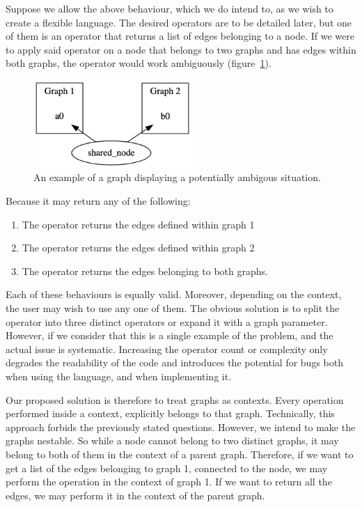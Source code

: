 Suppose we allow the above behaviour, which we do intend to, as we wish to create a flexible language.
The desired operators are to be detailed later, but one of them is an operator that returns a list of edges belonging to a node.
If we were to apply said operator on a node that belongs to two graphs and has edges within both graphs, the operator would work ambiguously
(figure~\ref{fig:syntax_ambigous}).

\begin{figure}[H]
    \centering
    \includegraphics[width=6cm]{figures/syntax_section/syntax_ambigous}
    \caption{An example of a graph displaying a potentially ambigous situation.}
    \label{fig:syntax_ambigous}
\end{figure}


Because it may return any of the following:
\begin{enumerate}
    \item The operator returns the edges defined within graph 1
    \item The operator returns the edges defined within graph 2
    \item The operator returns the edges belonging to both graphs.
\end{enumerate}

Each of these behaviours is equally valid.
Moreover, depending on the context, the user may wish to use any one of them.
The obvious solution is to split the operator into three distinct operators or expand it with a graph parameter.
However, if we consider that this is a single example of the problem, and the actual issue is systematic.
Increasing the operator count or complexity only degrades the readability of the code and introduces the potential for bugs
both when using the language, and when implementing it.

Our proposed solution is therefore to treat graphs as contexts.
Every operation performed inside a context, explicitly belongs to that graph.
Technically, this approach forbids the previously stated questions.
However, we intend to make the graphs nestable.
So while a node cannot belong to two distinct graphs, it may belong to both of them in the context of a parent graph.
Therefore, if we want to get a list of the edges belonging to graph 1, connected to the node, we may perform the
operation in the context of graph 1.
If we want to return all the edges, we may perform it in the context of the parent graph.

